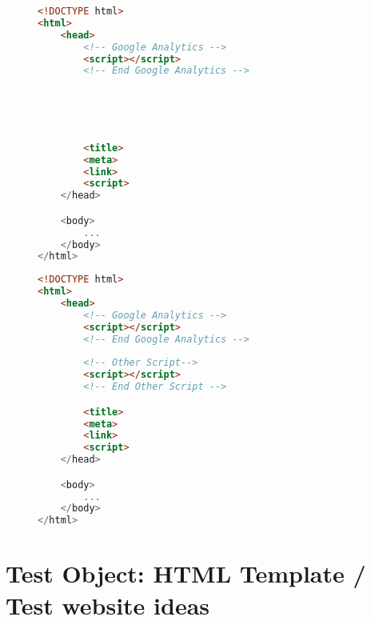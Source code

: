 \begin{sidewaysfigure}

\begin{multicols}{2}

\begin{center}
\begin{lstlisting}[caption={Other Script 1}, language=html, numbers=none]
<!DOCTYPE html>
<html>
    <head>
        <!-- Google Analytics -->
        <script></script>
        <!-- End Google Analytics -->
        




        <title>
        <meta>
        <link>
        <script>
    </head>

    <body>
        ...
    </body>
</html>
\end{lstlisting}
\end{center}

\columnbreak

\begin{center}
\begin{lstlisting}[caption={Other Script 2}, language=html, numbers=none]
<!DOCTYPE html>
<html>
    <head>
        <!-- Google Analytics -->
        <script></script>
        <!-- End Google Analytics -->
        
        <!-- Other Script-->
        <script></script>
        <!-- End Other Script -->

        <title>
        <meta>
        <link>
        <script>
    </head>

    <body>
        ...
    </body>
</html>
\end{lstlisting}
\end{center}


\end{multicols}

\end{sidewaysfigure}













\section{Test Object: HTML Template / Test website ideas}


